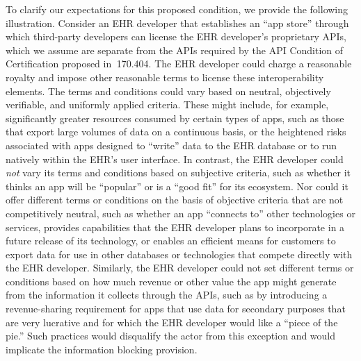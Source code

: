 \documentclass[twoside,11pt]{article}
\begin{document}
          To clarify our expectations for this proposed condition, we provide the following illustration. Consider an EHR developer that establishes an “app store” through which third-party developers can license the EHR developer's proprietary APIs, which we assume are separate from the APIs required by the API Condition of Certification proposed in \textsection{} 170.404. The EHR developer could charge a reasonable royalty and impose other reasonable terms to license these interoperability elements. The terms and conditions could vary based on neutral, objectively verifiable, and uniformly applied criteria. These might include, for example, significantly greater resources consumed by certain types of apps, such as those that export large volumes of data on a continuous basis, or the heightened risks associated with apps designed to “write” data to the EHR database or to run natively within the EHR's user interface. In contrast, the EHR developer could \emph{not} vary its terms and conditions based on subjective criteria, such as whether it thinks an app will be “popular” or is a “good fit” for its ecosystem. Nor could it offer different terms or conditions on the basis of objective criteria that are not competitively neutral, such as whether an app “connects to” other technologies or services, provides capabilities that the EHR developer plans to incorporate in a future release of its technology, or enables an efficient means for customers to export data for use in other databases or technologies that compete directly with the EHR developer. Similarly, the EHR developer could not set different terms or conditions based on how much revenue or other value the app might generate from the information it collects through the APIs, such as by introducing a revenue-sharing requirement for apps that use data for secondary purposes that are very lucrative and for which the EHR developer would like a “piece of the pie.” Such practices would disqualify the actor from this exception and would implicate the information blocking provision.
\end{document}
